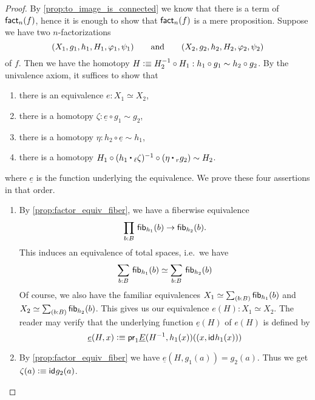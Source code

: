\begin{proof}
By \autoref{prop:to_image_is_connected} we know that there is a term of $\textsf{fact}_n(f)$, hence it is enough to
show that $\textsf{fact}_n(f)$ is a mere proposition. Suppose we have two $n$-factorizations
\begin{equation*}
{(X_1,g_1,h_1,H_1,\varphi_1,\psi_1)}\qquad\text{and}\qquad{(X_2,g_2,h_2,H_2,\varphi_2,\psi_2)}
\end{equation*}
of $f$. Then we have the homotopy $H\vcentcolon\equiv H_2^{-1}\circ H_1:h_1\circ g_1\sim h_2\circ g_2$. By the univalence axiom, it suffices to show that
\begin{enumerate}
\item there is an equivalence $e:X_1\simeq X_2$,
\item there is a homotopy $\zeta:\underline{e}\circ g_1\sim g_2$,
\item there is a homotopy $\eta:h_2\circ\underline{e}\sim h_1$,
\item there is a homotopy $H_1 \circ(h_1\leftwhisker\zeta)^{-1}\circ(\eta\rightwhisker g_2)\sim H_2$.
\end{enumerate}
where $\underline{e}$ is the function underlying the equivalence. We prove these four assertions in that order.
\begin{enumerate}
\item By \autoref{prop:factor_equiv_fiber}, we have a fiberwise equivalence
\begin{equation*}
\prd{b:B} \hfib{h_1}b\to\hfib{h_2}b.
\end{equation*}
This induces an equivalence of total spaces, i.e.\ we have
\begin{equation*}
\sm{b:B} \hfib{h_1}b\simeq\sm{b:B}\hfib{h_2}b
\end{equation*}
Of course, we also have the familiar equivalences $X_1\simeq\sm{b:B}\hfib{h_1}b$ and $X_2\simeq\sm{b:B}
\hfib{h_2}b$. This gives us our equivalence $e(H):X_1\simeq X_2$. The reader may verify that the underlying function
$\underline{e}(H)$ of $e(H)$ is defined by
\begin{equation*}
\underline{e}(H,x)\vcentcolon\equiv \mathsf{pr}_{1}\underline{E}(H^{-1},h_1(x))({(x,\mathsf{id}_{}{h_1(x)})})
\end{equation*}
\item By \autoref{prop:factor_equiv_fiber} we have $\underline{e}(H,g_1(a))=g_2(a)$. Thus we get $\zeta(a)\vcentcolon\equiv \mathsf{id}_{}{g_2(a)}$. 

\end{enumerate}
\end{proof}
